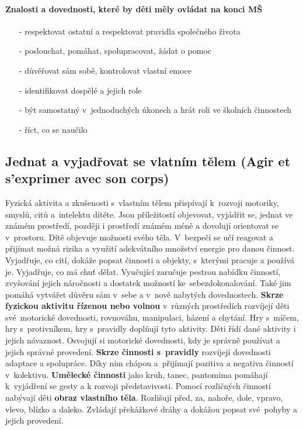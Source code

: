 			\paragraph{Znalosti a dovednosti, které by děti měly ovládat na konci MŠ}
			\begin{itemize}
				\setlength\itemsep{-2mm}
				\item[-] respektovat ostatní a respektovat pravidla společného života
				\item[-] poslouchat, pomáhat, spolupracovat, žádat o pomoc
				\item[-] důvěřovat sám sobě, kontrolovat vlastní emoce
				\item[-] identifikovat dospělé a jejich role
				\item[-] být samostatný v jednoduchých úkonech a hrát roli ve školních činnostech
				\item[-] říct, co se naučilo
				\end{itemize}

		\subsection{Jednat a vyjadřovat se vlatním tělem (Agir et s'exprimer avec son corps)}
			Fyzická aktivita a zkušenosti s vlastním tělem přispívají k rozvoji motoriky, smyslů, citů a intelektu dítěte. Jsou příležitostí objevovat, vyjádřit se, jednat ve známém prostředí, později i prostředí známém méně a dovolují orientovat se v prostoru. Dítě objevuje možnosti svého těla. V bezpečí se učí reagovat a přijímat možná rizika a využití adekvátního množství energie pro danou činnost. Vyjadřuje, co cítí, dokáže popsat činnosti a objekty, s kterými pracuje a používá je. Vyjadřuje, co má chuť dělat. Vyučující zaručuje  pestrou nabídku činností, zvyšování jejich náročnosti a dostatek možností ke sebezdokonalování. Také jim pomáhá vytvářet důvěru sám v sebe a v nově nabytých dovednostech. 
			\textbf{Skrze fyzickou aktivitu řízenou nebo volnou} v různých prostředích rozvíjejí děti své motorické dovednosti, rovnováhu, manipulaci, házení a chytání. Hry s míčem, hry s protivníkem, hry s pravidly doplňují tyto aktivity. Děti řídí dané aktivity i jejich návaznost. Osvojují si motorické dovednosti, kdy je správně používat a jejich správné provedení. 
			\textbf{Skrze činnosti s pravidly} rozvíjejí dovednosti adaptace a spolupráce. Díky nim chápou a přijímají pozitiva a negativa činností v kolektivu. 
			\textbf{Umělecké činnosti} jako kruh, tanec, pantomima pomáhají k vyjádření se gesty a k rozvoji představivosti.
			Pomocí rozličných činností nabývají děti \textbf{obraz vlastního těla}. Rozlišují před, za, nahoře, dole, vpravo, vlevo, blízko a daleko. Zvládají překážkové dráhy a dokážou popsat své pohyby a jejich provedení.
